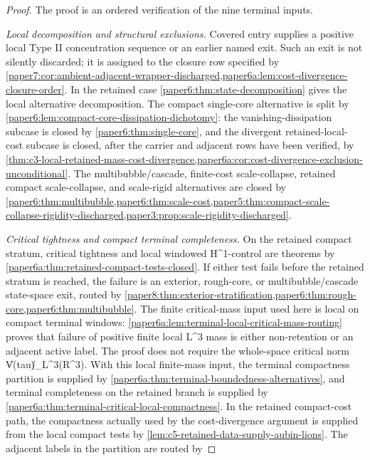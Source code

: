 \documentclass[11pt]{amsart}
\def\({}%
\def\){}%
\def\mathbb#1{#1}%
\def\tau{tau}%
\theoremstyle{plain}
\theoremstyle{definition}
\theoremstyle{remark}
\begin{document}
\begin{proof}
The proof is an ordered verification of the nine terminal inputs.
\par
\emph{Local decomposition and structural exclusions.}
Covered entry supplies a positive local Type II concentration sequence or an
earlier named exit.  Such an exit is not silently discarded; it is assigned to
the closure row specified by
\cref{paper7:cor:ambient-adjacent-wrapper-discharged,paper6a:lem:cost-divergence-closure-order}.
In the retained case
\cref{paper6:thm:state-decomposition} gives the local alternative
decomposition.  The compact single-core alternative is split by
\cref{paper6:lem:compact-core-dissipation-dichotomy}: the
vanishing-dissipation subcase is closed by
\cref{paper6:thm:single-core}, and the divergent retained-local-cost subcase is
closed, after the carrier and adjacent rows have been verified, by
\cref{thm:c3-local-retained-mass-cost-divergence,paper6a:cor:cost-divergence-exclusion-unconditional}.
The multibubble/cascade, finite-cost scale-collapse, retained compact
scale-collapse, and scale-rigid alternatives are closed by
\cref{paper6:thm:multibubble,paper6:thm:scale-cost,paper5:thm:compact-scale-collapse-rigidity-discharged,paper3:prop:scale-rigidity-discharged}.
\par
\emph{Critical tightness and compact terminal completeness.}
On the retained compact stratum, critical tightness and local windowed
\(H^1\)-control are theorems by
\cref{paper6a:thm:retained-compact-tests-closed}.  If either test fails before
the retained stratum is reached, the failure is an exterior, rough-core, or
multibubble/cascade state-space exit, routed by
\cref{paper8:thm:exterior-stratification,paper6:thm:rough-core,paper6:thm:multibubble}.
The finite critical-mass input used here is local on compact terminal windows:
\cref{paper6a:lem:terminal-local-critical-mass-routing} proves that failure of
positive finite local \(L^3\) mass is either non-retention or an adjacent active
label.  The proof does not require the whole-space critical norm
\(\|V(\tau)\|_{L^3(\mathbb R^3)}\).  With this local finite-mass input, the
terminal compactness partition is supplied by
\cref{paper6a:thm:terminal-boundedness-alternatives}, and terminal completeness
on the retained branch is supplied by
\cref{paper6a:thm:terminal-critical-local-compactness}.  In the retained
compact-cost path, the compactness actually used by the cost-divergence
argument is supplied from the local compact tests by
\cref{lem:c5-retained-data-supply-aubin-lions}.  The
adjacent labels in the partition are routed by

\end{proof}
\end{document}
